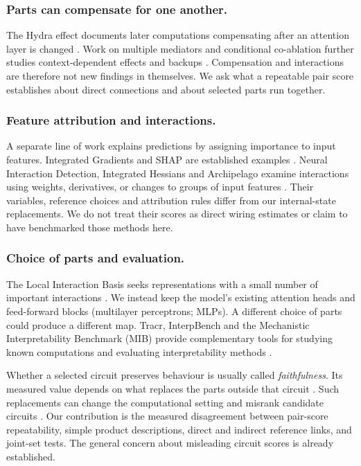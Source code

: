 \documentclass[11pt,letterpaper]{article}
\begin{document}
\subsubsection*{Parts can compensate for one another.}
The Hydra effect documents later computations compensating after an attention
layer is changed \cite{mcgrath2023hydra}. Work on multiple mediators and
conditional co-ablation further studies context-dependent effects and backups
\cite{vaidyanathan2026mediators,gong2026coax}. Compensation and interactions
are therefore not new findings in themselves. We ask what a repeatable pair
score establishes about direct connections and about selected parts run together.

\subsubsection*{Feature attribution and interactions.}
A separate line of work explains predictions by assigning importance to
input features. Integrated Gradients and SHAP are established examples
\cite{sundararajan2017axiomatic,lundberg2017unified}. Neural Interaction
Detection, Integrated Hessians and Archipelago examine interactions using
weights, derivatives, or changes to groups of input features
\cite{tsang2018detecting,janizek2021explaining,tsang2020archipelago}.
Their variables, reference choices and attribution rules differ from our
internal-state replacements. We do not treat their scores as direct wiring
estimates or claim to have benchmarked those methods here.

\subsubsection*{Choice of parts and evaluation.}
The Local Interaction Basis seeks representations with a small number of
important interactions \cite{bushnaq2024lib}. We instead keep the model's
existing attention heads and feed-forward blocks (multilayer perceptrons;
MLPs). A different choice of parts could produce a different map.
Tracr, InterpBench and the Mechanistic Interpretability Benchmark (MIB)
provide complementary tools for studying known computations and evaluating
interpretability methods
\cite{lindner2023tracr,gupta2024interpbench,mueller2025mib}.

Whether a selected circuit preserves behaviour is usually called
\emph{faithfulness}. Its measured value depends on what replaces the parts
outside that circuit \cite{miller2024robustness}. Such replacements can
change the computational setting and misrank candidate circuits
\cite{geng2026recovery}. Our contribution is the measured disagreement
between pair-score repeatability, simple product descriptions, direct and
indirect reference links, and joint-set tests. The general concern about
misleading circuit scores is already established.
\end{document}
